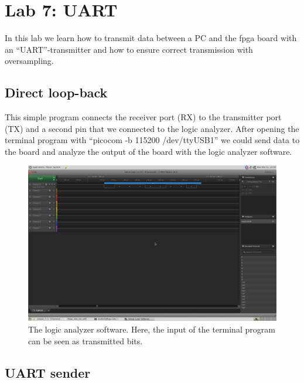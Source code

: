 \chapter{Lab 7: UART} \label{day7}

In this lab we learn how to transmit data between a PC and the \gls{fpga} board with an ``UART''-transmitter and how to ensure correct transmission with oversampling.

\section{Direct loop-back}

This simple program connects the receiver port (RX) to the transmitter port (TX) and a second pin that we connected to the logic analyzer. After opening the terminal program with ``picocom -b 115200 /dev/ttyUSB1'' we could send data to the board and analyze the output of the board with the logic analyzer software.




\begin{figure}[h]
	\centering
	\includegraphics[width=\linewidth]{./L7/E1/example_transmission.png}
	\caption{The logic analyzer software. Here, the input of the terminal program can be seen as transmitted bits.} 
	\label{fig: logic analyzer software e_7_1}
\end{figure}

\section{UART sender}

